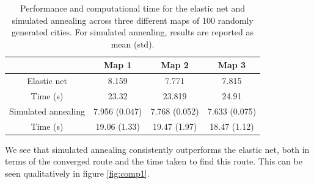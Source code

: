 \documentclass{article}
\begin{document}
\begin{table}[h]
\centering
\begin{tabular}{ |c|c|c|c|}
\hline
 &Map 1 &Map 2 & Map 3 \\
\hline
Elastic net & 8.159 & 7.771 & 7.815 \\
Time (s) & 23.32 & 23.819& 24.91 \\
\hline
Simulated annealing & 7.956 (0.047) & 7.768 (0.052)& 7.633 (0.075)\\
Time (s) & 19.06 (1.33) & 19.47 (1.97) & 18.47 (1.12)\\
\hline
\end{tabular}
\caption{Performance and computational time for the elastic net and simulated annealing across three different maps of 100 randomly generated cities. For simulated annealing, results are reported as mean (std).}
\label{tab:tsp}
\end{table}

We see that simulated annealing consistently outperforms the elastic net, both in terms of the converged route and the time taken to find this route. This can be seen qualitatively in figure \ref{fig:comp1}.
\end{document}
